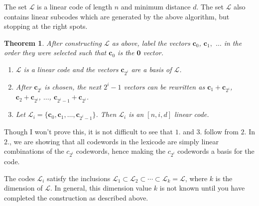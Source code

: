 \documentclass{article}
\newtheorem{theorem}{Theorem}
\numberwithin{theorem}{subsection}
\numberwithin{lemma}{subsection}
\theoremstyle{definition}
\numberwithin{exmp}{subsection}
\theoremstyle{definition}
\numberwithin{defn}{subsection}
\theoremstyle{definition}
\numberwithin{claim}{subsection}
\begin{document}
The set $\mathcal{L}$ is a linear code of length $n$ and minimum distance $d$.  The set $\mathcal{L}$ also contains linear subcodes which are generated by the above algorithm,
but stopping at the right spots.

\begin{theorem}
After constructing $\mathcal{L}$ as above, label the vectors $\mathbf{c}_0$, $\mathbf{c}_1,$ $\ldots$ in the order they were selected such that $\mathbf{c}_0$ is the $\mathbf{0}$ 
vector.

\begin{enumerate}
\item $\mathcal{L}$ is a linear code and the vectors $\mathbf{c}_{2^i}$ are a basis of $\mathcal{L}$.  
\item After $\mathbf{c}_{2^i}$ is chosen, the next $2^i -1$ vectors can be rewritten as $\mathbf{c}_1 + \mathbf{c}_{2^i}$, $\mathbf{c}_2 + \mathbf{c}_{2^i}$, $\ldots$, 
$\mathbf{c}_{2^i -1} + \mathbf{c}_{2^i}$.
\item Let $\mathcal{L}_i = \{\mathbf{c}_0,\mathbf{c}_1,\ldots,\mathbf{c}_{2^i -1}\}$.  Then $\mathcal{L}_i$ is an $[n,i,d]$ linear code.

\end{enumerate}

\end{theorem}

Though I won't prove this, it is not difficult to see that $1.$ and $3.$ follow from $2.$    In $2.$, we are showing that all codewords in the lexicode are simply linear combinations of 
the $c_{2^i}$ codewords, hence making the $c_{2^i}$ codewords a basis for the code.

The codes $\mathcal{L}_i$ satisfy the inclusions $\mathcal{L}_1 \subset \mathcal{L}_2 \subset \cdots \subset \mathcal{L}_k = \mathcal{L}$, where $k$ is the dimension of 
$\mathcal{L}$.  In general, this dimension value $k$ is not known until you have completed the construction as described above.
\end{document}
